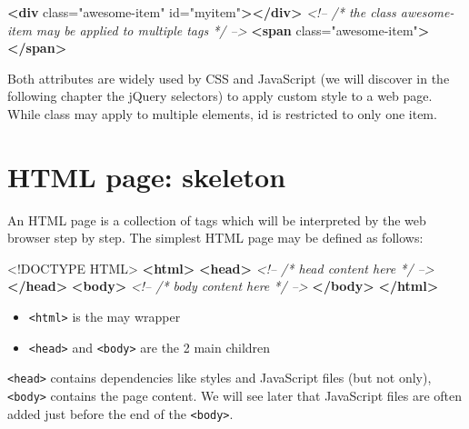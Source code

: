 \documentclass[]{book}
\newenvironment{Shaded}{\begin{snugshade}}{\end{snugshade}}
\newcommand{\CommentTok}[1]{\textcolor[rgb]{0.56,0.35,0.01}{\textit{#1}}}
\newcommand{\DataTypeTok}[1]{\textcolor[rgb]{0.13,0.29,0.53}{#1}}
\newcommand{\KeywordTok}[1]{\textcolor[rgb]{0.13,0.29,0.53}{\textbf{#1}}}
\newcommand{\NormalTok}[1]{#1}
\newcommand{\OtherTok}[1]{\textcolor[rgb]{0.56,0.35,0.01}{#1}}
\newcommand{\StringTok}[1]{\textcolor[rgb]{0.31,0.60,0.02}{#1}}
\providecommand{\tightlist}{%
  \setlength{\itemsep}{0pt}\setlength{\parskip}{0pt}}
\begin{document}
\begin{Shaded}
\begin{Highlighting}[]
\KeywordTok{<div}\OtherTok{ class=}\StringTok{"awesome-item"}\OtherTok{ id=}\StringTok{"myitem"}\KeywordTok{></div>}
\CommentTok{<!-- /* the class awesome-item may be applied to multiple tags */ -->}
\KeywordTok{<span}\OtherTok{ class=}\StringTok{"awesome-item"}\KeywordTok{></span>}
\end{Highlighting}
\end{Shaded}

Both attributes are widely used by CSS and JavaScript (we will discover in the following chapter the jQuery selectors) to apply custom style to a web page. While class may apply to multiple elements, id is restricted to only one item.

\hypertarget{html-page-skeleton}{%
\section{HTML page: skeleton}\label{html-page-skeleton}}

An HTML page is a collection of tags which will be interpreted by the web browser step by step. The simplest HTML page may be defined as follows:

\begin{Shaded}
\begin{Highlighting}[]
\DataTypeTok{<!DOCTYPE }\NormalTok{HTML}\DataTypeTok{>}
\KeywordTok{<html>}
  \KeywordTok{<head>}
  \CommentTok{<!-- /* head content here */ -->}
  \KeywordTok{</head>}
  \KeywordTok{<body>}
  \CommentTok{<!-- /* body content here */ -->}
  \KeywordTok{</body>}
\KeywordTok{</html>}
\end{Highlighting}
\end{Shaded}

\begin{itemize}
\tightlist
\item
  \texttt{\textless{}html\textgreater{}} is the may wrapper
\item
  \texttt{\textless{}head\textgreater{}} and \texttt{\textless{}body\textgreater{}} are the 2 main children
\end{itemize}

\texttt{\textless{}head\textgreater{}} contains dependencies like styles and JavaScript files (but not only), \texttt{\textless{}body\textgreater{}} contains the page content. We will see later that JavaScript files are often added just before the end of the \texttt{\textless{}body\textgreater{}}.
\end{document}
